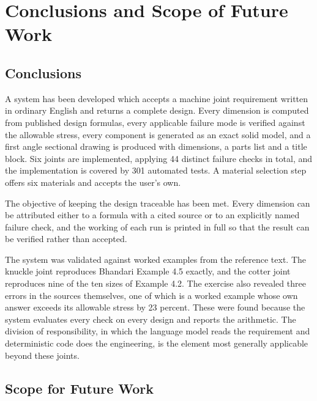 \chapter{Conclusions and Scope of Future Work}

\section{Conclusions}

A system has been developed which accepts a machine joint requirement written in ordinary English and returns a complete design. Every dimension is computed from published design formulas, every applicable failure mode is verified against the allowable stress, every component is generated as an exact solid model, and a first angle sectional drawing is produced with dimensions, a parts list and a title block. Six joints are implemented, applying 44 distinct failure checks in total, and the implementation is covered by 301 automated tests. A material selection step offers six materials and accepts the user's own.

The objective of keeping the design traceable has been met. Every dimension can be attributed either to a formula with a cited source or to an explicitly named failure check, and the working of each run is printed in full so that the result can be verified rather than accepted.

The system was validated against worked examples from the reference text. The knuckle joint reproduces Bhandari Example 4.5 exactly, and the cotter joint reproduces nine of the ten sizes of Example 4.2. The exercise also revealed three errors in the sources themselves, one of which is a worked example whose own answer exceeds its allowable stress by 23 percent. These were found because the system evaluates every check on every design and reports the arithmetic. The division of responsibility, in which the language model reads the requirement and deterministic code does the engineering, is the element most generally applicable beyond these joints.

\section{Scope for Future Work}

